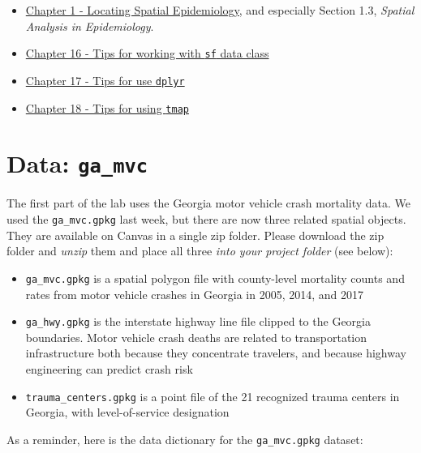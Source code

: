 \documentclass[
]{book}
\providecommand{\tightlist}{%
  \setlength{\itemsep}{0pt}\setlength{\parskip}{0pt}}
\begin{document}
\begin{itemize}
\tightlist
\item
  \href{https://mkram01.github.io/EPI563-SpatialEPI/locating-spatial-epidemiology.html}{Chapter 1 - Locating Spatial Epidemiology}, and especially Section 1.3, \emph{Spatial Analysis in Epidemiology}.
\item
  \href{https://mkram01.github.io/EPI563-SpatialEPI/sf-overview.html}{Chapter 16 - Tips for working with \texttt{sf} data class}
\item
  \href{https://mkram01.github.io/EPI563-SpatialEPI/dplyr.html}{Chapter 17 - Tips for use \texttt{dplyr}}
\item
  \href{https://mkram01.github.io/EPI563-SpatialEPI/intro-tmap.html}{Chapter 18 - Tips for using \texttt{tmap}}
\end{itemize}

\hypertarget{data-ga_mvc-1}{%
\section{\texorpdfstring{Data: \texttt{ga\_mvc}}{Data: ga\_mvc}}\label{data-ga_mvc-1}}

The first part of the lab uses the Georgia motor vehicle crash mortality data. We used the \texttt{ga\_mvc.gpkg} last week, but there are now three related spatial objects. They are available on Canvas in a single zip folder. Please download the zip folder and \emph{unzip} them and place all three \emph{into your project folder} (see below):

\begin{itemize}
\tightlist
\item
  \texttt{ga\_mvc.gpkg} is a spatial polygon file with county-level mortality counts and rates from motor vehicle crashes in Georgia in 2005, 2014, and 2017\\
\item
  \texttt{ga\_hwy.gpkg} is the interstate highway line file clipped to the Georgia boundaries. Motor vehicle crash deaths are related to transportation infrastructure both because they concentrate travelers, and because highway engineering can predict crash risk
\item
  \texttt{trauma\_centers.gpkg} is a point file of the 21 recognized trauma centers in Georgia, with level-of-service designation
\end{itemize}

As a reminder, here is the data dictionary for the \texttt{ga\_mvc.gpkg} dataset:
\end{document}
